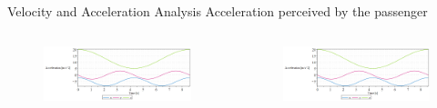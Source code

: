 \documentclass{beamer}              %
\begin{document}
\begin{frame}{Velocity and Acceleration Analysis}
		\centering Acceleration perceived by the passenger
		\begin{columns}
			\begin{column}{0.5\textwidth}				
				\begin{figure}						\includegraphics[width=150pt]{grafici/acc_pass_r.png}
				\end{figure}
			\end{column}
			\begin{column}{0.5\textwidth}
				\begin{figure}						\includegraphics[width=150pt]{grafici/acc_pass_g.png}
				\end{figure}
			\end{column}
		\end{columns}
	\end{frame}
\end{document}
